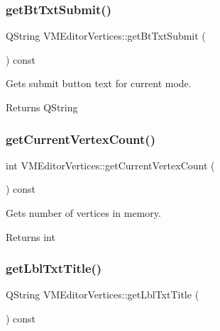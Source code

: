 \subsubsection{\texorpdfstring{getBtTxtSubmit()}{getBtTxtSubmit()}}
{\footnotesize\ttfamily Q\+String V\+M\+Editor\+Vertices\+::get\+Bt\+Txt\+Submit (\begin{DoxyParamCaption}{ }\end{DoxyParamCaption}) const}



Gets submit button text for current mode. 

\begin{DoxyReturn}{Returns}
Q\+String 
\end{DoxyReturn}
\mbox{\label{class_v_m_editor_vertices_ac126c0b810f29c803f54cea4a50b6953}} 
\subsubsection{\texorpdfstring{getCurrentVertexCount()}{getCurrentVertexCount()}}
{\footnotesize\ttfamily int V\+M\+Editor\+Vertices\+::get\+Current\+Vertex\+Count (\begin{DoxyParamCaption}{ }\end{DoxyParamCaption}) const}



Gets number of vertices in memory. 

\begin{DoxyReturn}{Returns}
int 
\end{DoxyReturn}
\mbox{\label{class_v_m_editor_vertices_acd45db915cce57f22aef0fa5869c78b8}} 
\subsubsection{\texorpdfstring{getLblTxtTitle()}{getLblTxtTitle()}}
{\footnotesize\ttfamily Q\+String V\+M\+Editor\+Vertices\+::get\+Lbl\+Txt\+Title (\begin{DoxyParamCaption}{ }\end{DoxyParamCaption}) const}



